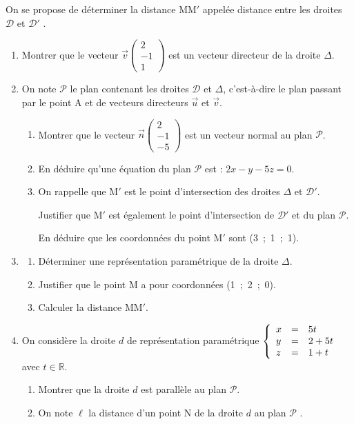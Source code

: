 \documentclass[10pt]{article}
\providecommand{\R}{\mathbb{R}}
\providecommand{\vect}[1]{\overrightarrow{#1}}
\begin{document}
On se propose de déterminer la distance MM$'$ appelée \og distance entre les droites $\mathcal{D}$ et $\mathcal{D}'$ \fg.
\begin{enumerate}[resume]
\item Montrer que le vecteur $\vect{v}\begin{pmatrix}2\\- 1\\1\end{pmatrix}$ est un vecteur directeur de la droite $\Delta$.
\item On note $\mathcal{P}$ le plan contenant les droites $\mathcal{D}$ et $\Delta$, c'est-à-dire le plan passant par le point A et de vecteurs directeurs $\vect{u}$ et $\vect{v}$.
	\begin{enumerate}
		\item Montrer que le vecteur $\vect{n}\begin{pmatrix}2\\-1\\-5 \end{pmatrix}$ est un vecteur normal au plan $\mathcal{P}$.
		\item En déduire qu'une équation du plan $\mathcal{P}$ est : $2x - y - 5z = 0$.
		\item On rappelle que M$'$ est le point d'intersection des droites $\Delta$ et $\mathcal{D}'$.
		
Justifier que M$'$ est également le point d'intersection de $\mathcal{D}'$ et du plan $\mathcal{P}$.
		
En déduire que les coordonnées du point M$'$ sont (3~;~1~;~1).
	\end{enumerate}
\item 
	\begin{enumerate}
		\item Déterminer une représentation paramétrique de la droite $\Delta$.
		\item Justifier que le point M a pour coordonnées (1~;~2~;~0).
		\item Calculer la distance MM$'$.
	\end{enumerate}
\item On considère la droite $d$ de représentation paramétrique $\left\{\begin{array}{l c l}
x &=& 5t\\y &=& 2 + 5t \\z&=&1 + t\end{array}\right.$ avec $t \in \R$.
	\begin{enumerate}
		\item Montrer que la droite $d$ est parallèle au plan $\mathcal{P}$.
		\item On note $\ell$ la distance d'un point N de la droite $d$ au plan $\mathcal{P}$ . 
		

\end{enumerate}
\end{enumerate}
\end{document}
